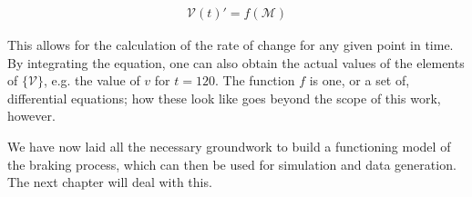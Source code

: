 \begin{align*}
{\mathcal{V}}(t)' = f ( {\mathcal{M}} )
\end{align*}

\noindent
This allows for the calculation of the rate of change for any given point in time. By integrating the equation, one can also obtain the actual values of the elements of $\{ {\mathcal{V}} \}$, e.g. the value of $v$ for $t=120$. The function $f$ is one, or a set of, differential equations; how these look like goes beyond the scope of this work, however.
\bigskip
\par\noindent
We have now laid all the necessary groundwork to build a functioning model of the braking process, which can then be used for simulation and data generation. The next chapter will deal with this.